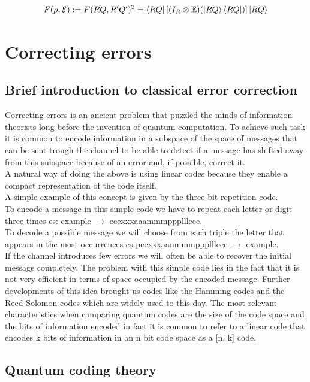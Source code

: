 \documentclass{article}
\begin{document}
\begin{equation}
	F(\rho,\mathcal{E}) := F(RQ,R'Q')^2 = \bra{RQ} \left[ (I_R \otimes \mathbb{E})(\ket{RQ}\bra{RQ}) \right] \ket{RQ}
\end{equation}



\section{Correcting errors}

\subsection{Brief introduction to classical error correction}

Correcting errors is an ancient problem that puzzled the minds of
information theorists long before the invention of quantum computation.
To achieve such task it is common to encode information in a subspace of
the space of messages that can be sent trough the channel to be able to
detect if a message has shifted away from this subspace because of an
error and, if possible, correct it.\\
A natural way of doing the above is using linear codes because they
enable a compact representation of the code itself.\\
A simple example of this concept is given by the three bit repetition
code.\\
To encode a message in this simple code we have to repeat each letter
or digit three times es: example $\rightarrow$ eeexxxaaammmpppllleee.\\
To decode a possible message we will choose from each triple the
letter that appears in the most occurrences es peexxxaanmmmpppllleee $\rightarrow$ example. \\
If the channel introduces few errors we will often be able to recover
the initial message completely.
The problem with this simple code lies in the fact that it is not very
efficient in terms of space occupied by the encoded message.
Further developments of this idea brought us codes like the Hamming
codes and the Reed-Solomon codes which are widely used to this day.
The most relevant characteristics when comparing quantum codes are
the size of the code space and the bits of information encoded in fact
it is common to refer to a linear code that encodes k bits of information
in an n bit code space as a [n, k] code.

\subsection{Quantum coding theory}
\end{document}
